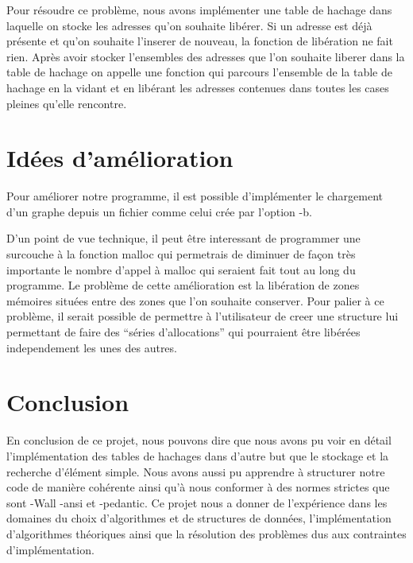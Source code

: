 \documentclass[15pt, a4paper]{article}
\begin{document}
\bigskip

Pour résoudre ce problème, nous avons implémenter une table de hachage
dans laquelle on stocke les adresses qu'on souhaite libérer. Si un
adresse est déjà présente et qu'on souhaite l'inserer de nouveau, la
fonction de libération ne fait rien. Après avoir stocker l'ensembles des
adresses que l'on souhaite liberer dans la table de hachage on appelle
une fonction qui parcours l'ensemble de la table de hachage en la vidant
et en libérant les adresses contenues dans toutes les cases pleines
qu'elle rencontre.

\section{Idées d'amélioration}

Pour améliorer notre programme, il est possible d'implémenter le chargement 
d'un graphe depuis un fichier comme celui crée par l'option -b. 

D'un point de vue technique, il peut être interessant de programmer une 
surcouche à la fonction malloc qui permetrais de diminuer de façon très 
importante le nombre d'appel à malloc qui seraient fait tout au long du 
programme. Le problème de cette amélioration est la libération de zones 
mémoires situées entre des zones que l'on souhaite conserver. Pour palier
à ce problème, il serait possible de permettre à l'utilisateur de creer une 
structure lui permettant de faire des ``séries d'allocations'' qui pourraient
être libérées independement les unes des autres. 

\section{Conclusion}

En conclusion de ce projet, nous pouvons dire que nous avons pu voir en détail
l'implémentation des tables de hachages dans d'autre but que le stockage et la
recherche d'élément simple. Nous avons aussi pu apprendre à structurer notre 
code de manière cohérente ainsi qu'à nous conformer à des normes strictes que 
sont -Wall -ansi et -pedantic. Ce projet nous a donner de l'expérience dans les
domaines du choix d'algorithmes et de structures de données, l'implémentation 
d'algorithmes théoriques ainsi que la résolution des problèmes dus aux 
contraintes d'implémentation.
\end{document}
